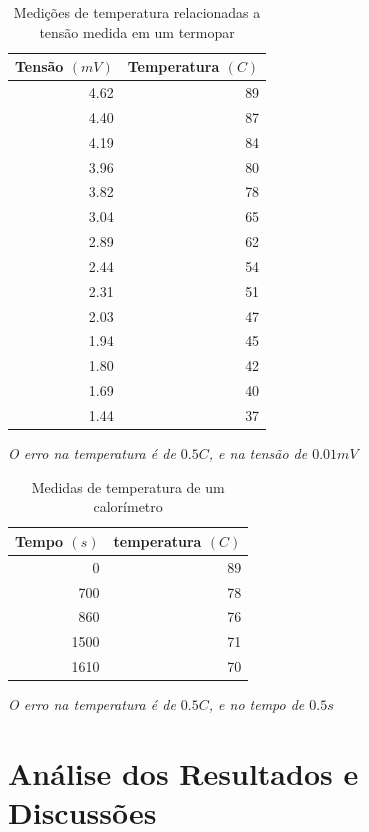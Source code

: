 \documentclass[12pt,a4paper]{article}
\begin{document}
\newpage
\begin{table}[!htbp]

\centering
\def\arraystretch{1.5}
\caption{Medições de temperatura relacionadas a tensão medida em um termopar}

\begin{tabular}{|r|r|}
\hline
Tensão $(mV)$ & Temperatura $(C)$\\
\hline
 4.62 & 89 \\
 \hline
 4.40  & 87 \\
 \hline
 4.19 & 84 \\
 \hline
 3.96 & 80 \\
 \hline
 3.82 & 78 \\
 \hline
 3.04 & 65 \\
 \hline
 2.89 & 62 \\
 \hline
 2.44 & 54 \\
 \hline
 2.31 & 51 \\
 \hline
 2.03 & 47 \\
 \hline
 1.94 & 45 \\
 \hline
 1.80  & 42 \\
 \hline
 1.69 & 40 \\
 \hline
 1.44 & 37 \\
\hline
\end{tabular}

\emph{O erro na temperatura é de $0.5 C$, e na tensão de $0.01 mV$}
\label{dadostermopar}
\end{table}

\begin{table}[!htbp]

\centering
\def\arraystretch{1.5}
\caption{Medidas de temperatura de um calorímetro}

\begin{tabular}{|r|r|}
\hline
Tempo $(s)$ & temperatura $(C)$ \\
\hline
    0 & 89 \\    
  700 & 78 \\
  860 & 76 \\
 1500 & 71 \\
 1610 & 70 \\
\hline
\end{tabular}

\emph{O erro na temperatura é de $0.5 C$, e no tempo de $0.5 s$}
\label{dadostempo}
\end{table}


\section{Análise dos Resultados e Discussões}
\end{document}
